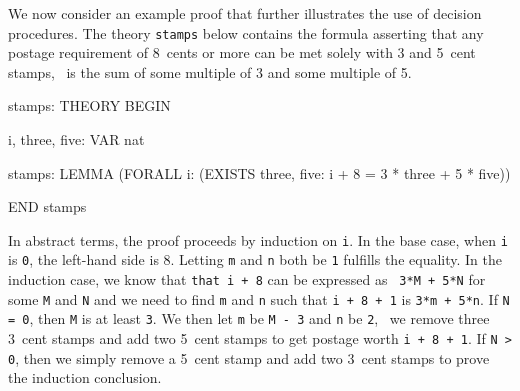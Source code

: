 We now consider an example proof that further illustrates the use of
decision procedures.  The theory {\tt stamps} below contains the formula
asserting that any postage requirement of 8~cents or more can be met
solely with 3 and 5~cent stamps, \ie\ is the sum of some multiple of 3
and some multiple of 5.

\begin{pvsscript}
stamps: THEORY
  BEGIN
  
  i, three, five: VAR nat
  
  stamps: LEMMA (FORALL i: (EXISTS three, five: i + 8 = 3 * three + 5 * five))
  
  END stamps
\end{pvsscript}

In abstract terms, the proof proceeds by induction on {\tt i}.  In the
base case, when {\tt i} is {\tt 0}, the left-hand side is 8.  Letting
{\tt m} and {\tt n} both be {\tt 1} fulfills the equality.  In the
induction case, we know that {\tt that i + 8} can be expressed as {\tt
3*M + 5*N} for some {\tt M} and {\tt N} and we need to find {\tt m} and
{\tt n} such that {\tt i + 8 + 1} is {\tt 3*m + 5*n}.  If {\tt N = 0},
then {\tt M} is at least {\tt 3}.  We then let {\tt m} be {\tt  M - 3}
and {\tt n} be {\tt 2}, \ie\ we remove three 3~cent stamps and add two
5~cent stamps to get postage worth {\tt i + 8 + 1}.  If {\tt N > 0},
then we simply remove a 5~cent stamp and add two 3~cent stamps to prove
the induction conclusion.

